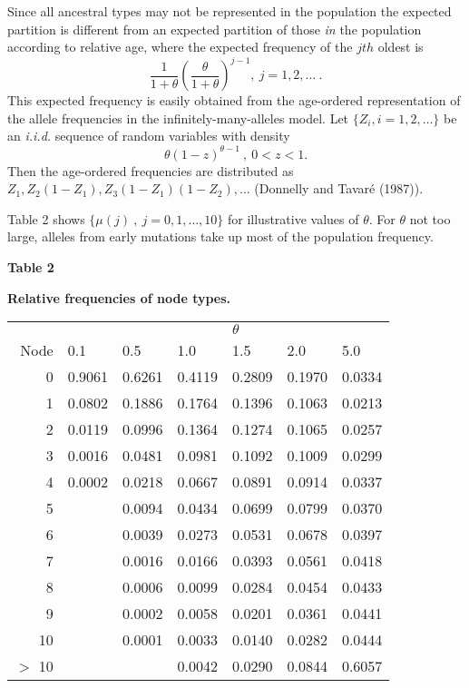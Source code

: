     Since all ancestral types may not be represented in the population the
expected partition is different from an expected partition of those {\em in}
the population according to relative age, where the expected frequency of
the $jth$ oldest is
$$\frac{1}{1 + \theta }\left (\frac{\theta }{1 + \theta}\right )^{j - 1},
~j = 1,2, \ldots~.$$
This expected frequency is easily obtained from the age-ordered representation
of the allele frequencies in the infinitely-many-alleles model.
Let $\{Z_i,i = 1,2,\ldots \}$ be an {\em i.i.d.} sequence of random
variables with density
	$$\theta (1 - z)^{\theta - 1}~,~0 < z < 1.$$
Then the age-ordered frequencies are distributed as
$Z_1, Z_2(1 - Z_1), Z_3(1 - Z_1)(1 - Z_2), \ldots$
(Donnelly and Tavar\'{e} (1987)).

    Table 2 shows $\{\mu (j)~,~j = 0,1,\ldots ,10\}$ for illustrative values of 
$\theta.$ For $\theta$ not too large, alleles from early mutations 
take up most of the population frequency.
\vspace{0.5cm}
\begin{Large}
\begin{center}
{\bf Table 2}
\end{center}
\end{Large}
\vspace{0.5cm}
\begin{large}
\begin{center}
{\bf Relative frequencies of node types.}
\end{center}
\end{large}
\begin{tabular}{rllllll}
& & & & $\theta$ \\
Node   & 0.1 & 0.5 & 1.0 & 1.5 & 2.0 & 5.0 \\ \cline{2-7}
0 &0.9061 &0.6261 &0.4119 &0.2809 &0.1970 &0.0334 \\
1 &0.0802 &0.1886 &0.1764 &0.1396 &0.1063 &0.0213 \\
2 &0.0119 &0.0996 &0.1364 &0.1274 &0.1065 &0.0257 \\
3 &0.0016 &0.0481 &0.0981 &0.1092 &0.1009 &0.0299 \\
4 &0.0002 &0.0218 &0.0667 &0.0891 &0.0914 &0.0337 \\
5 &       &0.0094 &0.0434 &0.0699 &0.0799 &0.0370 \\
6 &       &0.0039 &0.0273 &0.0531 &0.0678 &0.0397 \\
7 &       &0.0016 &0.0166 &0.0393 &0.0561 &0.0418 \\
8 &       &0.0006 &0.0099 &0.0284 &0.0454 &0.0433 \\
9 &       &0.0002 &0.0058 &0.0201 &0.0361 &0.0441 \\
10 &      &0.0001 &0.0033 &0.0140 &0.0282 &0.0444 \\
$>$ 10 &    &       &0.0042 &0.0290 &0.0844 &0.6057
\end{tabular}
\vspace{0.5cm}


